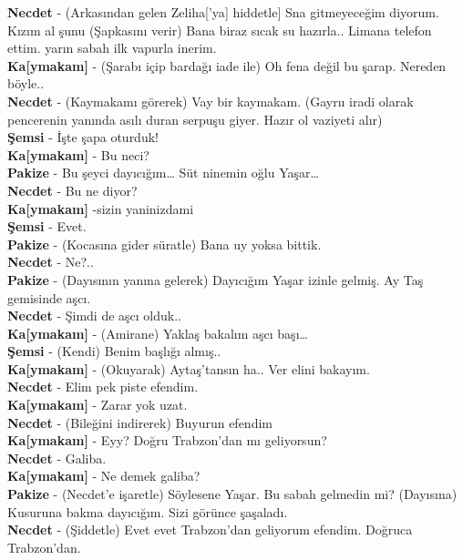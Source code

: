 \documentclass[]{book}
\begin{document}
\textbf{Necdet} - (Arkasından gelen Zeliha{[}'ya{]} hiddetle{]} Sna gitmeyeceğim diyorum. Kızım al şunu (Şapkasını verir) Bana biraz sıcak su hazırla.. Limana telefon ettim. yarın sabah ilk vapurla inerim.\\
\textbf{Ka{[}ymakam{]}} - (Şarabı içip bardağı iade ile) Oh fena değil bu şarap. Nereden böyle..\\
\textbf{Necdet} - (Kaymakamı görerek) Vay bir kaymakam. (Gayrıı iradi olarak pencerenin yanında asılı duran serpuşu giyer. Hazır ol vaziyeti alır)\\
\textbf{Şemsi} - İşte şapa oturduk!\\
\textbf{Ka{[}ymakam{]}} - Bu neci?\\
\textbf{Pakize} - Bu şeyci dayıcığım\ldots{} Süt ninemin oğlu Yaşar\ldots{}\\
\textbf{Necdet} - Bu ne diyor?\\
\textbf{Ka{[}ymakam{]}} -sizin yaninizdami\\
\textbf{Şemsi} - Evet.\\
\textbf{Pakize} - (Kocasına gider süratle) Bana uy yoksa bittik.\\
\textbf{Necdet} - Ne?..\\
\textbf{Pakize} - (Dayısının yanına gelerek) Dayıcığım Yaşar izinle gelmiş. Ay Taş gemisinde aşcı.\\
\textbf{Necdet} - Şimdi de aşcı olduk..\\
\textbf{Ka{[}ymakam{]}} - (Amirane) Yaklaş bakalım aşcı başı\ldots{}\\
\textbf{Şemsi} - (Kendi) Benim başlığı almış..\\
\textbf{Ka{[}ymakam{]}} - (Okuyarak) Aytaş'tansın ha.. Ver elini bakayım.\\
\textbf{Necdet} - Elim pek piste efendim.\\
\textbf{Ka{[}ymakam{]}} - Zarar yok uzat.\\
\textbf{Necdet} - (Bileğini indirerek) Buyurun efendim\\
\textbf{Ka{[}ymakam{]}} - Eyy? Doğru Trabzon'dan mı geliyorsun?\\
\textbf{Necdet} - Galiba.\\
\textbf{Ka{[}ymakam{]}} - Ne demek galiba?\\
\textbf{Pakize} - (Necdet'e işaretle) Söylesene Yaşar. Bu sabah gelmedin mi? (Dayısına) Kusuruna bakma dayıcığım. Sizi görünce şaşaladı.\\
\textbf{Necdet} - (Şiddetle) Evet evet Trabzon'dan geliyorum efendim. Doğruca Trabzon'dan.\\
\end{document}
